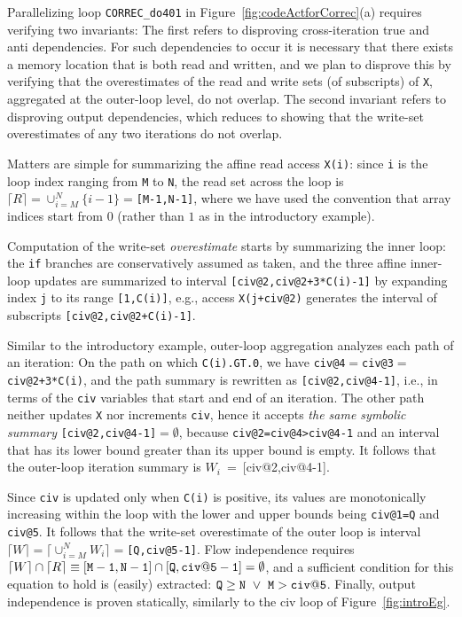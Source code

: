 \documentclass{sig-alternate}
\begin{document}
Parallelizing loop {\tt CORREC\_do401} in Figure~\ref{fig:codeActforCorrec}(a)
requires verifying two invariants: The first refers to disproving 
cross-iteration true and anti dependencies. For such dependencies to occur it 
is necessary that there exists a memory location that is both read and written,
and we plan to disprove this by verifying that the overestimates of the read 
and write sets (of subscripts) of {\tt X}, aggregated at the outer-loop level, 
do not overlap. 
%
The second invariant refers to disproving output dependencies, which reduces to 
showing that the write-set overestimates of any two iterations do not overlap. 

Matters are simple for summarizing the affine 
read access {\tt X(i)}: since {\tt i} is the loop index ranging from {\tt M} to {\tt N}, the
read set across the loop is  {\tt$\lceil R \rceil =\cup_{i=M}^{N}\{i-1\}=$[M-1,N-1]},
where we have used the convention that array indices start from $0$ 
(rather than $1$ as in the introductory example). 

Computation of the write-set {\em overestimate} starts by summarizing 
the inner loop: the {\tt if} branches are conservatively assumed as taken, 
and  the three affine inner-loop updates  are summarized to interval
{\tt[civ@2,civ@2+3*C(i)-1]} by expanding index {\tt j} to its range 
{\tt [1,C(i)]}, e.g., access {\tt X(j+civ@2)} generates the interval 
of subscripts {\tt[civ@2,civ@2+C(i)-1]}.   

Similar to the introductory example, outer-loop aggregation
analyzes each path of an iteration:
On the path on which {\tt C(i).GT.0}, we have %
{\tt civ@4$=$civ@3$=$civ@2+3*C(i)}, and the path summary is
rewritten as {\tt [civ@2,civ@4-1]}, i.e., in terms of the {\tt civ}
variables that start and end of an iteration. The other path neither 
updates {\tt X} nor increments {\tt civ}, hence it accepts 
{\em the same symbolic summary} {\tt[civ@2,civ@4-1]$=\emptyset$}, 
because {\tt{}civ@2=civ@4>civ@4-1} and an interval that has its lower 
bound greater than its upper bound is empty.
%
It follows that the outer-loop iteration summary is
{$W_i$~=~[civ@2,civ@4-1]}.

Since {\tt civ} is updated only when {\tt C(i)} is positive,
its values are monotonically increasing within the loop with
the lower and upper bounds being {\tt civ@1=Q} and {\tt civ@5}. 
It follows that the write-set overestimate of the outer loop is 
interval $\lceil W \rceil = \lceil \cup_{i=M}^{N}W_i\rceil =${\tt[Q,civ@5-1]}.
Flow independence requires   
$\lceil W\rceil\cap\lceil R \rceil \equiv {\tt [M-1,N-1]}\cap{\tt{}[Q,civ@5-1]}=\emptyset$,
and a sufficient condition for this equation to hold is (easily) extracted:
${\tt Q} \ge {\tt N}~\vee~{\tt M} > {\tt{}civ@5}$.
%
Finally, output independence is proven statically, similarly to the 
{\sc civ} loop of Figure~\ref{fig:introEg}.
\end{document}
